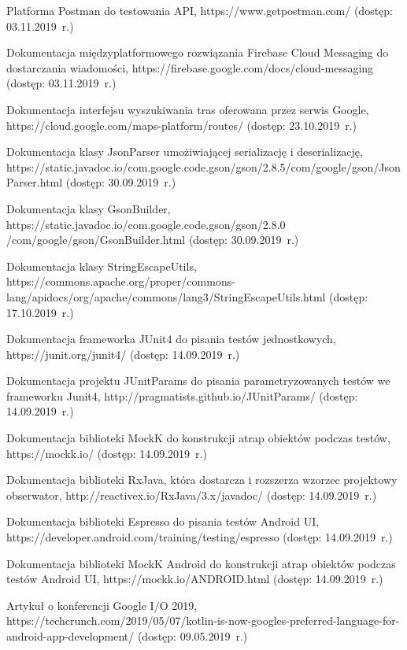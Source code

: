 \begin{thebibliography}{3}
   Platforma Postman do testowania API, https://www.getpostman.com/ (dostęp: 03.11.2019~r.)
  
   Dokumentacja międzyplatformowego rozwiązania Firebase Cloud Messaging do dostarczania wiadomości, https://firebase.google.com/docs/cloud-messaging (dostęp: 03.11.2019~r.)
  
   Dokumentacja interfejsu wyszukiwania tras oferowana przez serwis Google, https://cloud.google.com/maps-platform/routes/ (dostęp: 23.10.2019~r.)

   Dokumentacja klasy JsonParser umożiwiającej serializację i deserializację, https://static.javadoc.io/com.google.code.gson/gson/2.8.5/com/google/gson/JsonParser.html (dostęp: 30.09.2019~r.)

   Dokumentacja klasy GsonBuilder, https://static.javadoc.io/com.google.code.gson/gson/2.8.0\\/com/google/gson/GsonBuilder.html (dostęp: 30.09.2019~r.)

   Dokumentacja klasy StringEscapeUtils, https://commons.apache.org/proper/commons-lang/apidocs/org/apache/commons/lang3/StringEscapeUtils.html (dostęp: 17.10.2019~r.)
  
   Dokumentacja frameworka JUnit4 do pisania testów jednostkowych, https://junit.org/junit4/ (dostęp: 14.09.2019~r.)
  
   Dokumentacja projektu JUnitParams do pisania parametryzowanych testów we frameworku Junit4, http://pragmatists.github.io/JUnitParams/ (dostęp: 14.09.2019~r.)
  
   Dokumentacja biblioteki MockK do konstrukcji atrap obiektów podczas testów, https://mockk.io/ (dostęp: 14.09.2019~r.)
  
   Dokumentacja biblioteki RxJava, która dostarcza i rozszerza wzorzec projektowy obserwator, http://reactivex.io/RxJava/3.x/javadoc/ (dostęp: 14.09.2019~r.) 
  
   Dokumentacja biblioteki Espresso do pisania testów Android UI, https://developer.android.com/training/testing/espresso (dostęp: 14.09.2019~r.)
  
   Dokumentacja biblioteki MockK Android do konstrukcji atrap obiektów podczas testów Android UI, https://mockk.io/ANDROID.html (dostęp: 14.09.2019~r.)
  
   Artykuł o konferencji Google I/O 2019, https://techcrunch.com/2019/05/07/kotlin-is-now-googles-preferred-language-for-android-app-development/ (dostęp: 09.05.2019~r.)
  

\end{thebibliography}
